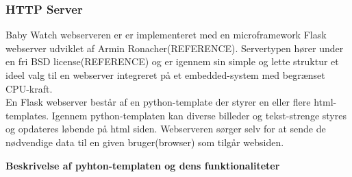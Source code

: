 \subsubsection*{HTTP Server}

Baby Watch webserveren er er implementeret med en microframework Flask  webserver udviklet af Armin Ronacher(REFERENCE). Servertypen hører under en fri BSD license(REFERENCE) og er igennem sin simple og lette struktur et ideel valg til en webserver integreret på et embedded-system med begrænset CPU-kraft. \\
En Flask webserver består af en python-template der styrer en eller flere html-templates. Igennem python-templaten kan diverse billeder og tekst-strenge styres og opdateres løbende på html siden. Webserveren sørger selv for at sende de nødvendige data til en given bruger(browser) som tilgår websiden. 

\textbf{Beskrivelse af pyhton-templaten og dens funktionaliteter}

\vspace{5mm}

